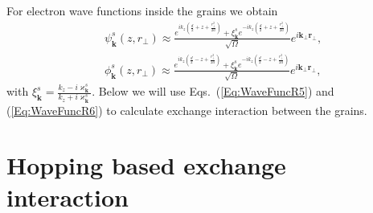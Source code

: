 \documentclass[aps,prb,amsmath,amssymb,twocolumn,superscriptaddress,showpacs,floatfix]{revtex4-1}
\begin{document}
For electron wave functions inside the grains we obtain
\begin{equation}\label{Eq:WaveFuncR6}
\begin{split}
&\psi^s_\mathbf k(z,r_\perp)\approx\frac{e^{ik_{z}\left(\frac{d}{2}+ z+\frac{r_\perp^2}{2a}\right)}+\xi^s_\mathbf k e^{-ik_z\left(\frac{d}{2}+ z+\frac{r_\perp^2}{2a}\right)}}{\sqrt{\Omega}}e^{i\mathbf k_\perp \mathbf r_\perp},\\
&\phi^s_\mathbf k(z,r_\perp)\approx\frac{e^{ik_{z}\left(\frac{d}{2}- z+\frac{r_\perp^2}{2a}\right)}+\xi^s_\mathbf k e^{-ik_z\left(\frac{d}{2}- z+\frac{r_\perp^2}{2a}\right)}}{\sqrt{\Omega}}e^{i\mathbf k_\perp \mathbf r_\perp},
\end{split}
\end{equation}
with $\xi^s_{\mathbf k} = \frac{k_z-i\varkappa^s_{\mathbf k }}{k_z+i\varkappa^s_{\mathbf k }}$. Below we will use Eqs.~(\ref{Eq:WaveFuncR5}) and (\ref{Eq:WaveFuncR6}) to calculate exchange interaction between the grains.



\section{Hopping based exchange interaction}\label{Sec:ExHop}
\end{document}
